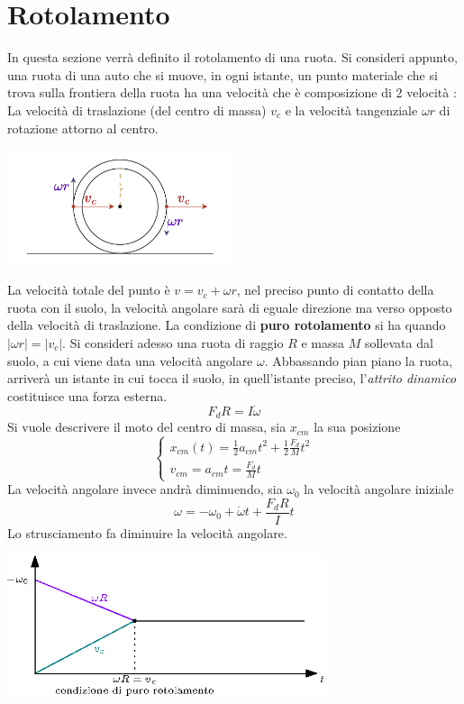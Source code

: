 \documentclass[10pt, letterpaper]{report}
\begin{document}
\section{Rotolamento}
In questa sezione verrà definito il rotolamento di una ruota. Si consideri appunto, una ruota di una auto che si muove, in ogni istante, un punto materiale che si trova sulla frontiera della ruota ha una velocità che è 
composizione di 2 velocità : La velocità di traslazione (del centro di massa) $v_c$ e la velocità tangenziale $\omega r$ di rotazione attorno al centro.
\begin{center}
    \includegraphics[width=0.5\textwidth ]{images/rotolamento.pdf}
\end{center}
La velocità totale del punto è $v=v_c+\omega r$, nel preciso punto di contatto della ruota con il suolo, la velocità angolare sarà di eguale direzione ma verso opposto della velocità di traslazione. La condizione di 
\textbf{puro rotolamento} si ha quando $|\omega r |= |v_c|$. \acc 
Si consideri adesso una ruota di raggio $R$ e massa $M$ sollevata dal suolo, a cui viene data una velocità angolare $\omega$. Abbassando pian piano la ruota, arriverà un istante in cui tocca il suolo, in quell'istante preciso, 
l'\textit{attrito dinamico} costituisce una forza esterna.
$$ F_dR=I\dot{\omega}$$
Si vuole descrivere il moto del centro di massa, sia $x_{cm}$ la sua posizione 
$$ \begin{cases}
    x_{cm}(t)=\frac{1}{2}a_{cm}t^2+\frac{1}{2}\frac{F_d}{M}t^2 \\ 
    v_{cm}=a_{cm}t=\frac{F_d}{M}t
\end{cases}$$
La velocità angolare invece andrà diminuendo, sia $\omega_0$ la velocità angolare iniziale 
$$ \omega = -\omega_0+\dot{\omega}t+\frac{F_dR}{I}t$$
Lo strusciamento fa diminuire la velocità angolare.
\begin{center}
    \includegraphics[width=0.7\textwidth ]{images/puroRot.eps}
\end{center}
\end{document}
